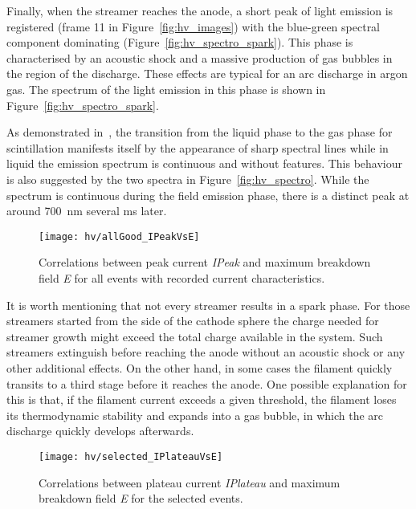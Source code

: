 Finally, when the streamer reaches the anode, a short peak of light emission is registered (frame \num{11} in Figure~\ref{fig:hv_images}) with the blue-green spectral component dominating (Figure~\ref{fig:hv_spectro_spark}).
This phase is characterised by an acoustic shock and a massive production of gas bubbles in the region of the discharge.
These effects are typical for an arc discharge in argon gas.
The spectrum of the light emission in this phase  is shown in Figure~\ref{fig:hv_spectro_spark}. 

As demonstrated in~\cite{Heindl}, the transition from the liquid phase to the gas phase for scintillation manifests itself by the appearance of sharp spectral lines while in liquid the emission spectrum is continuous and without features.
This behaviour is also suggested by the two spectra in Figure~\ref{fig:hv_spectro}.
While the spectrum is continuous during the field emission phase, there is a distinct peak at around \SI{700}{\nano\metre} several \si{\milli\second} later.

\begin{figure}[tbp]
	\centering
	\texttt{[image: hv/allGood\_IPeakVsE]}
	\caption[ test peak current versus maximum breakdown field]{%
		Correlations between peak current \emph{IPeak} and maximum breakdown field \emph{E} for all events with recorded current characteristics.
	}
	\label{fig:hv_IPeakVsE}
\end{figure}

It is worth mentioning that not every streamer results in a spark phase.
For those streamers started from the side of the cathode sphere the charge needed for streamer growth might exceed the total charge available in the system.
Such streamers extinguish before reaching the anode without an acoustic shock or any other additional effects.
On the other hand, in some cases the filament quickly transits to a third stage before it reaches the anode.
One possible explanation for this is that, if the filament current exceeds a given threshold, the filament loses its thermodynamic stability and expands into a gas bubble, in which the arc discharge quickly develops afterwards.

\begin{figure}[tbp]
	\centering
	\texttt{[image: hv/selected\_IPlateauVsE]}
	\caption[ test plateau current versus maximum breakdown field]{%
		Correlations between plateau current \emph{IPlateau} and maximum breakdown field \emph{E} for the selected events.
	}
	\label{fig:hv_IPlateauVsE}
\end{figure}

